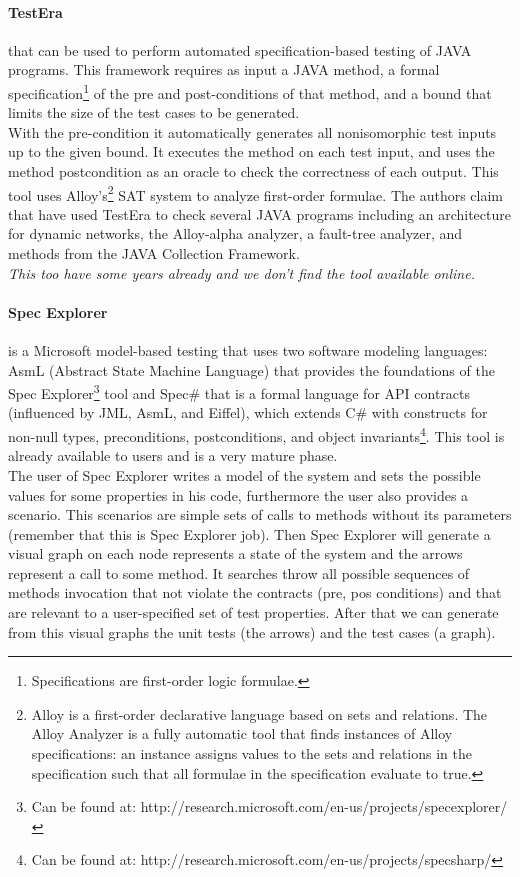 \documentclass{llncs}
\begin{document}
\paragraph{\textbf{TestEra}\cite{testera}}
that can be used to perform automated specification-based testing of
JAVA programs. This framework requires as input a JAVA method, a formal specification\footnote{Specifications are first-order logic formulae.}
of the pre and post-conditions of that method, and
a bound that limits the size of the test cases to be generated.\\
With the pre-condition it automatically generates all nonisomorphic test inputs up to the given bound.
It executes the method on each test input, and uses the method postcondition as an oracle to check the correctness of each output. This tool
uses Alloy's\footnote{Alloy is a first-order declarative language based on sets and relations. The Alloy Analyzer is a fully
automatic tool that finds instances of Alloy specifications: an instance
assigns values to the sets and relations in the specification such that
all formulae in the specification evaluate to true.}
SAT system to analyze first-order  formulae.
The authors claim that have used TestEra to check several JAVA programs including an architecture for
dynamic networks, the Alloy-alpha analyzer, a fault-tree analyzer, and methods from the JAVA Collection Framework.\\
\textit{This too have some years already and we don't find the tool available online.}

\paragraph{\textbf{Spec Explorer}} is a Microsoft model-based testing that uses two software modeling languages:
AsmL (Abstract State Machine Language) that provides the foundations of the Spec Explorer\footnote{Can be found at: http://research.microsoft.com/en-us/projects/specexplorer/} tool
and Spec\# that is a formal language for API contracts (influenced by JML, AsmL, and Eiffel), which extends C\# with constructs for non-null types,
preconditions, postconditions, and object invariants\footnote{Can be found at: http://research.microsoft.com/en-us/projects/specsharp/}.
This tool is already available to users and is a very mature phase.\\

The user of Spec Explorer writes a model of the system and sets the possible values for some properties in his code, furthermore the user also provides a scenario.
This scenarios are simple sets of calls to methods without its parameters (remember that this is Spec Explorer job).
Then Spec Explorer will generate a visual graph on each node represents a state of the system and the arrows represent a call to some method.
It searches throw all possible sequences of methods invocation that not violate the contracts (pre, pos conditions) and
that are relevant to a user-specified set of test properties. After that we can generate from this visual graphs the unit tests (the arrows) and the
test cases (a graph).
\end{document}
